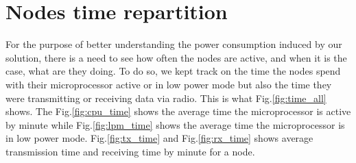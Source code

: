 \section{Nodes time repartition}

For the purpose of better understanding the power consumption induced by our solution, there is a need to see how often the nodes are active, and when it is the case, what are they doing. To do so, we kept track on the time the nodes spend with their microprocessor active or in low power mode but also the time they were transmitting or receiving data via radio. This is what Fig.\ref{fig:time_all} shows. The Fig.\ref{fig:cpu_time} shows the average time the microprocessor is active by minute while Fig.\ref{fig:lpm_time} shows the average time the microprocessor is in low power mode. Fig.\ref{fig:tx_time} and Fig.\ref{fig:rx_time} shows average transmission time and receiving time by minute for a node. \\

